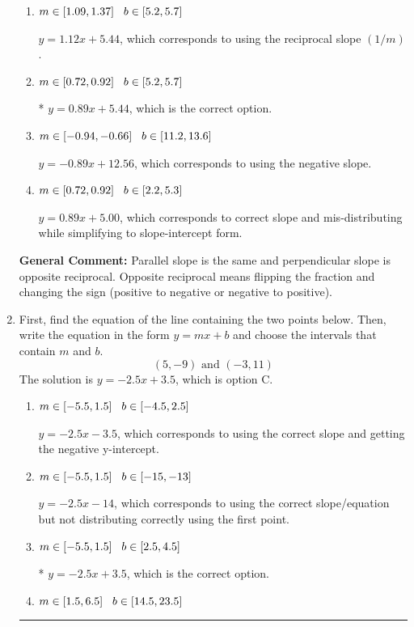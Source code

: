\documentclass{extbook}[14pt]
\newcommand{\litem}[1]{\item #1

\rule{\textwidth}{0.4pt}}
\begin{document}
\begin{enumerate}
{\begin{enumerate}[label=\Alph*.]
 $y = 0.89x - 5.44$, which corresponds to using the correct slope and getting the negative $y$-intercept.
\item \( m \in [1.09, 1.37] \hspace*{3mm} b \in [5.2, 5.7] \)

 $y = 1.12x + 5.44$, which corresponds to using the reciprocal slope $(1/m)$.
\item \( m \in [0.72, 0.92] \hspace*{3mm} b \in [5.2, 5.7] \)

* $y = 0.89x + 5.44$, which is the correct option.
\item \( m \in [-0.94, -0.66] \hspace*{3mm} b \in [11.2, 13.6] \)

 $y = -0.89x + 12.56$, which corresponds to using the negative slope.
\item \( m \in [0.72, 0.92] \hspace*{3mm} b \in [2.2, 5.3] \)

 $y = 0.89x + 5.00$, which corresponds to correct slope and mis-distributing while simplifying to slope-intercept form.
\end{enumerate}

\textbf{General Comment:} Parallel slope is the same and perpendicular slope is opposite reciprocal. Opposite reciprocal means flipping the fraction and changing the sign (positive to negative or negative to positive).
}
\litem{
First, find the equation of the line containing the two points below. Then, write the equation in the form $ y=mx+b $ and choose the intervals that contain $m$ and $b$.
\[ (5, -9) \text{ and } (-3, 11) \]The solution is \( y = -2.5x + 3.5 \), which is option C.\begin{enumerate}[label=\Alph*.]
\item \( m \in [-5.5, 1.5] \hspace*{3mm} b \in [-4.5, 2.5] \)

 $y = -2.5x -3.5$, which corresponds to using the correct slope and getting the negative y-intercept.
\item \( m \in [-5.5, 1.5] \hspace*{3mm} b \in [-15, -13] \)

 $y = -2.5x -14$, which corresponds to using the correct slope/equation but not distributing correctly using the first point.
\item \( m \in [-5.5, 1.5] \hspace*{3mm} b \in [2.5, 4.5] \)

* $y = -2.5x + 3.5$, which is the correct option.
\item \( m \in [1.5, 6.5] \hspace*{3mm} b \in [14.5, 23.5] \)


\end{enumerate}}
\end{enumerate}
\end{document}
